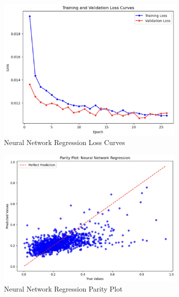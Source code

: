 \documentclass[
  11pt,
]{article}
\begin{document}
\begin{figure}[H]

{\centering \includegraphics[width=3.6in,height=\textheight]{../images/nn-regression-loss-curves.png}

}

\caption{Neural Network Regression Loss Curves}

\end{figure}%
\begin{figure}[H]

{\centering \includegraphics[width=3.6in,height=\textheight]{../images/nn-regression-parity-plot.png}

}

\caption{Neural Network Regression Parity Plot}

\end{figure}%
\end{document}
